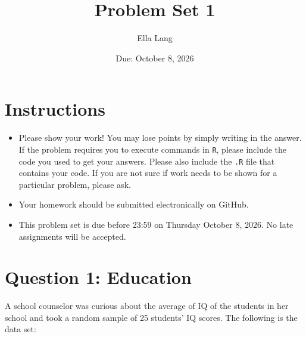 \documentclass[12pt,letterpaper]{article}
\title{Problem Set 1}
\date{Due: October 8, 2026}
\author{Ella Lang}
\begin{document}
	\maketitle
	
	\section*{Instructions}
	\begin{itemize}
	\item Please show your work! You may lose points by simply writing in the answer. If the problem requires you to execute commands in \texttt{R}, please include the code you used to get your answers. Please also include the \texttt{.R} file that contains your code. If you are not sure if work needs to be shown for a particular problem, please ask.
\item Your homework should be submitted electronically on GitHub.
\item This problem set is due before 23:59 on Thursday October 8, 2026. No late assignments will be accepted.
	\end{itemize}
	
	\vspace{1cm}
	\section*{Question 1: Education}

A school counselor was curious about the average of IQ of the students in her school and took a random sample of 25 students' IQ scores. The following is the data set:\\
\vspace{.5cm}

  


\vspace{1cm}
\end{document}

